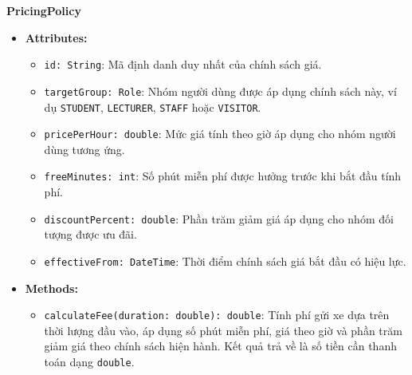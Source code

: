 \noindent\textbf{PricingPolicy}
\begin{itemize}
	\item \textbf{Attributes:}
	\begin{itemize}
		\item \texttt{id: String}: Mã định danh duy nhất của chính sách giá.
		\item \texttt{targetGroup: Role}: Nhóm người dùng được áp dụng chính sách này, ví dụ \texttt{STUDENT}, \texttt{LECTURER}, \texttt{STAFF} hoặc \texttt{VISITOR}.
		\item \texttt{pricePerHour: double}: Mức giá tính theo giờ áp dụng cho nhóm người dùng tương ứng.
		\item \texttt{freeMinutes: int}: Số phút miễn phí được hưởng trước khi bắt đầu tính phí.
		\item \texttt{discountPercent: double}: Phần trăm giảm giá áp dụng cho nhóm đối tượng được ưu đãi.
		\item \texttt{effectiveFrom: DateTime}: Thời điểm chính sách giá bắt đầu có hiệu lực.
	\end{itemize}
	\item \textbf{Methods:}
	\begin{itemize}
		\item \texttt{calculateFee(duration: double): double}: Tính phí gửi xe dựa trên thời lượng đầu vào, áp dụng số phút miễn phí, giá theo giờ và phần trăm giảm giá theo chính sách hiện hành. Kết quả trả về là số tiền cần thanh toán dạng \texttt{double}.
	\end{itemize}
\end{itemize}

